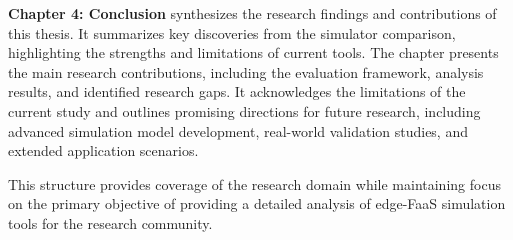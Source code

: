 \textbf{Chapter 4: Conclusion} synthesizes the research findings and contributions of this thesis. It summarizes key discoveries from the simulator comparison, highlighting the strengths and limitations of current tools. The chapter presents the main research contributions, including the evaluation framework, analysis results, and identified research gaps. It acknowledges the limitations of the current study and outlines promising directions for future research, including advanced simulation model development, real-world validation studies, and extended application scenarios.

This structure provides coverage of the research domain while maintaining focus on the primary objective of providing a detailed analysis of edge-FaaS simulation tools for the research community.